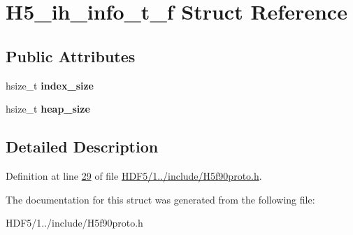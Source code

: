 \hypertarget{struct_h5__ih__info__t__f}{}\section{H5\+\_\+ih\+\_\+info\+\_\+t\+\_\+f Struct Reference}
\label{struct_h5__ih__info__t__f}
\subsection*{Public Attributes}
\begin{DoxyCompactItemize}
\item 
\mbox{\label{struct_h5__ih__info__t__f_a83e58c675dd2ff5747a19e36240929b9}} 
hsize\+\_\+t {\bfseries index\+\_\+size}
\item 
\mbox{\label{struct_h5__ih__info__t__f_a606c3c42e374d3fb27a9d4ad999bd0c5}} 
hsize\+\_\+t {\bfseries heap\+\_\+size}
\end{DoxyCompactItemize}


\subsection{Detailed Description}


Definition at line \hyperlink{_h_d_f5_21_810_81_2include_2_h5f90proto_8h_source_l00029}{29} of file \hyperlink{_h_d_f5_21_810_81_2include_2_h5f90proto_8h_source}{H\+D\+F5/1../include/\+H5f90proto.\+h}.



The documentation for this struct was generated from the following file\+:\begin{DoxyCompactItemize}
\item 
H\+D\+F5/1../include/\+H5f90proto.\+h\end{DoxyCompactItemize}
